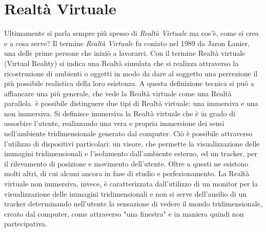 \chapter{Realtà Virtuale}
\label{capitolo2}
\thispagestyle{empty}


\noindent Ultimamente si parla sempre più spesso di \textit{Realtà Virtuale} ma cos'è, come si crea e a cosa serve?
Il termine \textit{Realtà Virtuale} fu coniato nel 1989 da Jaron Lanier, una delle prime persone che iniziò a lavorarci. Con il termine Realtà virtuale (Virtual Reality) si indica una Realtà simulata che si realizza attraverso la ricostruzione di ambienti o oggetti in modo da dare al soggetto una percezione il più possibile realistica della loro esistenza. A questa definizione tecnica si può a affiancare una più generale, che vede la Realtà virtuale come una Realtà parallela. è possibile distinguere due tipi di Realtà virtuale: una immersiva e una non immersiva. Si definisce immersiva la Realtà virtuale che è in grado di assorbire l'utente, realizzando una vera e propria immersione dei sensi nell'ambiente tridimensionale generato dal computer. Ciò è possibile attraverso l'utilizzo di dispositivi particolari: un visore, che permette la visualizzazione delle immagini tridimensionali e l'isolamento dall'ambiente esterno, ed un tracker, per il rilevamento di posizione e movimento dell'utente. Oltre a questi ne esistono molti altri, di cui alcuni ancora in fase di studio e perfezionamento. La Realtà virtuale non immersiva, invece, è caratterizzata dall'utilizzo di un monitor per la visualizzazione delle immagini tridimensionali e non si serve dell'ausilio di un tracker determinando nell'utente la sensazione di vedere il mondo tridimensionale, creato dal computer, come attraverso "una finestra" e in maniera quindi non partecipativa.
